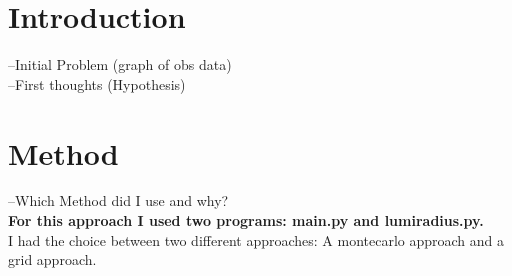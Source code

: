 \documentclass[a4paper,10pt]{article}
\date{03/15/15}
\begin{document}
 \section{Introduction}
 --Initial Problem (graph of obs data)\\
 --First thoughts (Hypothesis)\\
 \section{Method}
 --Which Method did I use and why?\\
 \textbf{For this approach I used two programs: main.py and lumiradius.py.} \\
 
 I had the choice between two different approaches: A montecarlo approach and a grid approach. \\
 
\end{document}
